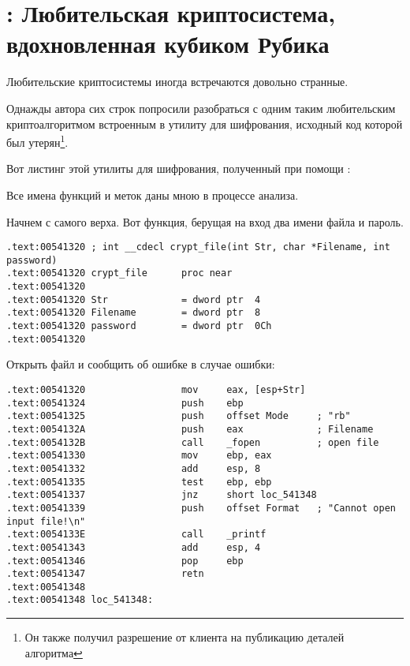 \section{: Любительская криптосистема, вдохновленная кубиком Рубика}

Любительские криптосистемы иногда встречаются довольно странные.

Однажды автора сих строк попросили разобраться с одним таким любительским криптоалгоритмом встроенным в 
утилиту для шифрования, исходный код которой был утерян\footnote{Он также получил разрешение от 
клиента на публикацию деталей алгоритма}.

Вот листинг этой утилиты для шифрования, полученный при помощи \IDA:



Все имена функций и меток даны мною в процессе анализа.

Начнем с самого верха. Вот функция, берущая на вход два имени файла и пароль.


\begin{lstlisting}[style=customasm]
.text:00541320 ; int __cdecl crypt_file(int Str, char *Filename, int password)
.text:00541320 crypt_file      proc near
.text:00541320
.text:00541320 Str             = dword ptr  4
.text:00541320 Filename        = dword ptr  8
.text:00541320 password        = dword ptr  0Ch
.text:00541320
\end{lstlisting}

Открыть файл и сообщить об ошибке в случае ошибки:

\begin{lstlisting}[style=customasm]
.text:00541320                 mov     eax, [esp+Str]
.text:00541324                 push    ebp
.text:00541325                 push    offset Mode     ; "rb"
.text:0054132A                 push    eax             ; Filename
.text:0054132B                 call    _fopen          ; open file
.text:00541330                 mov     ebp, eax
.text:00541332                 add     esp, 8
.text:00541335                 test    ebp, ebp
.text:00541337                 jnz     short loc_541348
.text:00541339                 push    offset Format   ; "Cannot open input file!\n"
.text:0054133E                 call    _printf
.text:00541343                 add     esp, 4
.text:00541346                 pop     ebp
.text:00541347                 retn
.text:00541348
.text:00541348 loc_541348:
\end{lstlisting}

